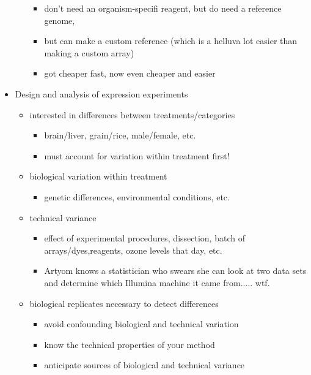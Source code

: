\documentclass{article}
\begin{document}
\begin{itemize}
\begin{itemize}
\begin{itemize}
                \item don't need an organism-specifi reagent, but do need a reference genome,
                \item but can make a custom reference (which is a helluva lot easier than making a custom array)
                \item got cheaper fast, now even cheaper and easier
            \end{itemize}
        \end{itemize}
        \item Design and analysis of expression experiments
        \begin{itemize}
            \item interested in differences between treatments/categories
            \begin{itemize}
                \item brain/liver, grain/rice, male/female, etc.
                \item must account for variation within treatment first!
            \end{itemize}
            \item biological variation within treatment
            \begin{itemize}
                \item genetic differences, environmental conditions, etc.
            \end{itemize}
            \item technical variance
            \begin{itemize}
                \item effect of experimental procedures, dissection, batch of arrays/dyes,reagents, ozone levels that day, etc.
                \item Artyom knows a statistician who swears she can look at two data sets and determine which Illumina machine it came from..... wtf.
            \end{itemize}
            \item biological replicates necessary to detect differences
            \begin{itemize}
                \item avoid confounding biological and technical variation
                \item know the technical properties of your method
                \item anticipate sources of biological and technical variance
            \end{itemize}

\end{itemize}
\end{itemize}
\end{document}
